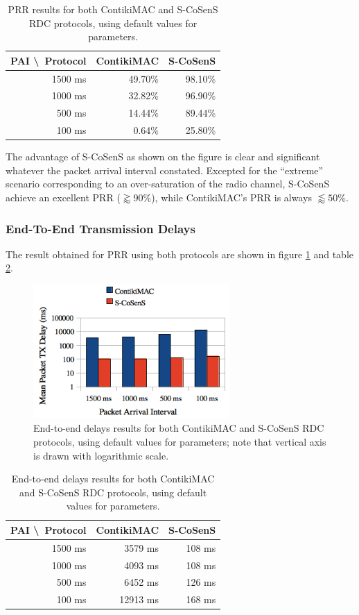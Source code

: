 \documentclass[a4paper,twoside]{article}
\begin{document}
\begin{table}
\centering
\begin{tabular}{|r|r|r|}
\hline
 PAI \textbackslash\ Protocol & ContikiMAC & S-CoSenS \\
\hline
 1500 ms & 49.70\% & 98.10\% \\
 1000 ms & 32.82\% & 96.90\% \\
  500 ms & 14.44\% & 89.44\% \\
  100 ms &  0.64\% & 25.80\% \\
\hline
\end{tabular}
\caption{PRR results for both ContikiMAC and S-CoSenS RDC protocols,
         using default values for parameters.}
\label{TblPRRresults}
\end{table}

The advantage of S-CoSenS as shown on the figure is clear and significant
whatever the packet arrival interval constated. Excepted for the ``extreme''
scenario corresponding to an over-saturation of the radio channel, S-CoSenS
achieve an excellent PRR ($\gtrapprox 90\%$), while ContikiMAC's PRR
is always $\lessapprox 50\%$.

\subsubsection{End-To-End Transmission Delays}

The result obtained for PRR using both protocols are shown in figure
\ref{FigDelaysResults} and table \ref{TblDelaysResults}.

\begin{figure}
  \centering
  \includegraphics[width=7.5cm]{DelaysGraph.png}
  \caption{End-to-end delays results for both ContikiMAC and S-CoSenS RDC
           protocols, using default values for parameters; note that
           vertical axis is drawn with logarithmic scale.}
  \label{FigDelaysResults}
\end{figure}

\begin{table}
\centering
\begin{tabular}{|r|r|r|}
\hline
 PAI \textbackslash\ Protocol & ContikiMAC & S-CoSenS \\
\hline
 1500 ms &  3579 ms & 108 ms \\
 1000 ms &  4093 ms & 108 ms \\
  500 ms &  6452 ms & 126 ms \\
  100 ms & 12913 ms & 168 ms \\
\hline
\end{tabular}
\caption{End-to-end delays results for both ContikiMAC and S-CoSenS RDC
         protocols, using default values for parameters.}
\label{TblDelaysResults}
\end{table}
\end{document}
